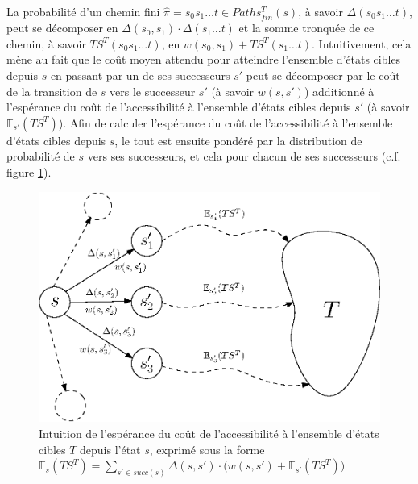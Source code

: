 \documentclass[12pt,a4paper]{report}
\theoremstyle{definition}%
\theoremstyle{remark}
\newcommand{\cf}{c.f. }
\begin{document}
La probabilité d'un chemin fini $\hat{\pi} = s_0 s_1 \dots t \in Paths_{fin}^T(s)$, à savoir $\Delta(s_0 s_1 \dots t)$, peut se décomposer en $\Delta(s_0, s_1) \cdot \Delta(s_1 \dots t)$ et la somme tronquée de ce chemin, à savoir $TS^T(s_0 s_1 \dots t)$, en $w(s_0, s_1) + TS^T(s_1 \dots t)$. Intuitivement, cela mène au fait   que le coût moyen attendu pour atteindre l'ensemble d'états cibles depuis $s$ en passant par un de ses successeurs $s'$ peut se décomposer par le coût de la transition de $s$ vers le successeur $s'$ (à savoir $w(s, s')$) additionné à l'espérance du coût de l'accessibilité à l'ensemble d'états cibles depuis $s'$ (à savoir $\mathbb{E}_{s'}(TS^T)$). Afin de calculer l'espérance du coût de l'accessibilité à l'ensemble d'états cibles depuis $s$, le tout est ensuite pondéré par la distribution de probabilité de $s$ vers ses successeurs, et cela pour chacun de ses successeurs (\cf figure \ref{intuitionES}).

	\begin{figure}[H]
	\centering
	\captionsetup{justification=centering}
	\includegraphics[scale=0.75]{figures/intuitionES.eps}
	\caption{Intuition de l'espérance du coût de l'accessibilité à l'ensemble d'états cibles $T$ depuis l'état $s$, exprimé sous la forme $\mathbb{E}_s(TS^T) = \sum_{s' \in succ(s)} \Delta(s, s') \cdot \big( w(s, s') + \mathbb{E}_{s'}(TS^T) \big)$}
	\label{intuitionES}
\end{figure}
\end{document}
